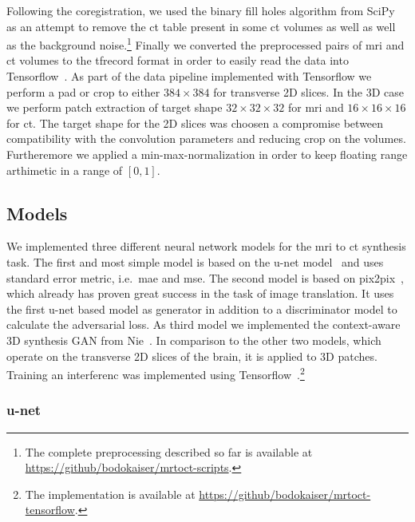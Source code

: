 Following the coregistration, we used the binary fill holes algorithm from
SciPy~\cite{SciPy} as an attempt to remove the \gls{ct} table present in some
\gls{ct} volumes as well as well as the background noise.\footnote{The complete
preprocessing described so far is available at
\url{https://github/bodokaiser/mrtoct-scripts}.} Finally we converted the
preprocessed pairs of \gls{mri} and \gls{ct} volumes to the tfrecord format
in order to easily read the data into Tensorflow~\cite{Tensorflow15}. As part
of the data pipeline implemented with Tensorflow we perform a pad or crop to
either $384\times384$ for transverse 2D slices. In the 3D case we perform
patch extraction of target shape $32\times32\times32$ for \gls{mri} and
$16\times16\times16$ for \gls{ct}. The target shape for the 2D slices was
choosen a compromise between compatibility with the convolution parameters and
reducing crop on the volumes. Furtheremore we applied a min-max-normalization
in order to keep floating range arthimetic in a range of $[0,1]$.

\subsection{Models}

We implemented three different neural network models for the \gls{mri} to
\gls{ct} synthesis task. The first and most simple model is based on the
u-net model~\cite{Ronneberger15} and uses standard error metric, i.e.\
\gls{mae} and \gls{mse}. The second model is based on pix2pix~\cite{Isola16},
which already has proven great success in the task of image translation. It
uses the first u-net based model as generator in addition to a discriminator
model to calculate the adversarial loss. As third model we implemented the
context-aware 3D synthesis GAN from Nie~\cite{Nie16}. In comparison to the
other two models, which operate on the transverse 2D slices of the brain, it
is applied to 3D patches. Training an interferenc was implemented using
Tensorflow~\cite{Tensorflow15}.\footnote{The implementation is available at
\url{https://github/bodokaiser/mrtoct-tensorflow}.}

\subsubsection{u-net}

